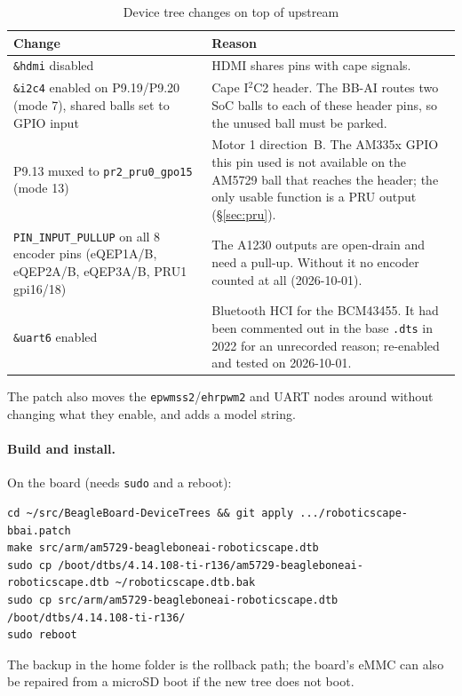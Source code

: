 \begin{table}[htbp]
\centering
\caption{Device tree changes on top of upstream}
\label{tab:dt}
\small
\begin{tabularx}{\linewidth}{>{\raggedright\arraybackslash}p{1.9in}X}
\toprule
Change & Reason \\
\midrule
\texttt{\&hdmi} disabled & HDMI shares pins with cape signals. \\
\texttt{\&i2c4} enabled on P9.19/P9.20 (mode 7), shared balls set to GPIO
  input & Cape I$^2$C2 header. The BB-AI routes two SoC balls to each of these
  header pins, so the unused ball must be parked. \\
P9.13 muxed to \texttt{pr2\_pru0\_gpo15} (mode 13) & Motor 1 direction~B. The
  AM335x GPIO this pin used is not available on the AM5729 ball that reaches
  the header; the only usable function is a PRU output (\S\ref{sec:pru}). \\
\texttt{PIN\_INPUT\_PULLUP} on all 8 encoder pins (eQEP1A/B, eQEP2A/B,
  eQEP3A/B, PRU1 gpi16/18) & The A1230 outputs are open-drain and need a
  pull-up. Without it no encoder counted at all (2026-10-01). \\
\texttt{\&uart6} enabled & Bluetooth HCI for the BCM43455. It had been
  commented out in the base \texttt{.dts} in 2022 for an unrecorded reason;
  re-enabled and tested on 2026-10-01. \\
\bottomrule
\end{tabularx}
\end{table}

The patch also moves the \texttt{epwmss2}/\texttt{ehrpwm2} and UART nodes
around without changing what they enable, and adds a model string.

\paragraph{Build and install.} On the board (needs \texttt{sudo} and a reboot):
\begin{lstlisting}
cd ~/src/BeagleBoard-DeviceTrees && git apply .../roboticscape-bbai.patch
make src/arm/am5729-beagleboneai-roboticscape.dtb
sudo cp /boot/dtbs/4.14.108-ti-r136/am5729-beagleboneai-roboticscape.dtb ~/roboticscape.dtb.bak
sudo cp src/arm/am5729-beagleboneai-roboticscape.dtb /boot/dtbs/4.14.108-ti-r136/
sudo reboot
\end{lstlisting}
The backup in the home folder is the rollback path; the board's eMMC can also
be repaired from a microSD boot if the new tree does not boot.

